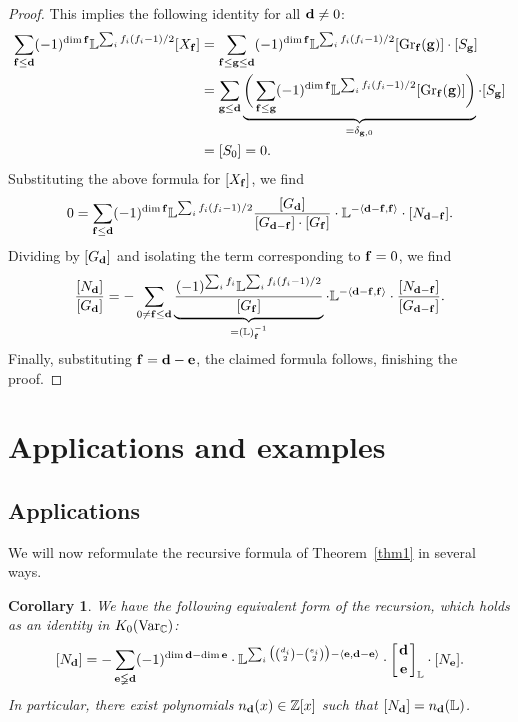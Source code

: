 \documentclass[pdftex]{sigma}
\numberwithin{equation}{section}
\newtheorem{Corollary}[Theorem]{Corollary}
\theoremstyle{definition}
\begin{document}
\begin{proof}
This implies the following identity for all ${\bf d}\not=0$:
\begin{align*}
\sum_{{\bf f}\leq{\bf d}}(-1)^{\dim{\bf f}}\mathbb{L}^{\sum_i f_i(f_i-1)/2}[X_{\bf f}]&=\sum_{{\bf f}\leq{\bf g}\leq{\bf d}}(-1)^{\dim{\bf f}}\mathbb{L}^{\sum_i f_i(f_i-1)/2}[{\rm Gr}_{\bf f}({\bf g})]\cdot[S_{\bf g}]
\\
&=\sum_{{\bf g}\leq{\bf d}}\underbrace{\bigg(\sum_{{\bf f}\leq{\bf g}}(-1)^{\dim {\bf f}}\mathbb{L}^{\sum_if_i(f_i-1)/2}[{\rm Gr}_{\bf f}({\bf g})]\bigg)}_{=\delta_{{\bf g},{0}}}\cdot[S_{\bf g}]\\
&=[S_{ 0}]=0.
\end{align*}
Substituting the above formula for $[X_{\bf f}]$, we find
\[0=\sum_{{\bf f}\leq{\bf d}}(-1)^{\dim{\bf f}}\mathbb{L}^{\sum_i f_i(f_i-1)/2}\frac{[G_{\bf d}]}{[G_{{\bf d}-{\bf f}}]\cdot[G_{\bf f}]}\cdot\mathbb{L}^{-\langle{\bf d}-{\bf f},{\bf f}\rangle}\cdot[N_{{\bf d}-{\bf f}}].\]
Dividing by $[G_{\bf d}]$ and isolating the term corresponding to ${\bf f}={ 0}$, we find
\[\frac{[N_{\bf d}]}{[G_{\bf d}]}=-\sum_{{0}\not={\bf f}\leq{\bf d}}\underbrace{\frac{(-1)^{\sum_if_i}\mathbb{L}^{\sum_if_i(f_i-1)/2}}{[G_{\bf f}]}}_{=(\mathbb{L})_{{\bf f}}^{-1}}\cdot\mathbb{L}^{-\langle{\bf d}-{\bf f},{\bf f}\rangle}\cdot\frac{[N_{{\bf d}-{\bf f}}]}{[G_{{\bf d}-{\bf f}}]}.\]
Finally, substituting ${\bf f}={\bf d}-{\bf e}$, the claimed formula follows, finishing the proof.\end{proof}

\section{Applications and examples}\label{s3}

\subsection{Applications}

We will now reformulate the recursive formula of Theorem~\ref{thm1} in several ways.

\begin{Corollary}\label{cor31} We have the following equivalent form of the recursion, which holds as an identity in $K_0({\rm Var}_\mathbb{C})$:
\[[N_{\bf d}]=-\sum_{{\bf e}\lneqq{\bf d}}(-1)^{\dim{\bf d}-\dim{\bf e}}\cdot\mathbb{L}^{\sum_i\big({d_i\choose 2}-{e_i\choose 2}\big)-\langle{\bf e},{\bf d}-{\bf e}\rangle}\cdot\left[{{\bf d}\atop{\bf e}}\right]_\mathbb{L}\cdot{[N_{\bf e}]}.\]
In particular, there exist polynomials $n_{\bf d}(x)\in\mathbb{Z}[x]$ such that $[N_{\bf d}]=n_{\bf d}(\mathbb{L})$.
\end{Corollary}
\end{document}
